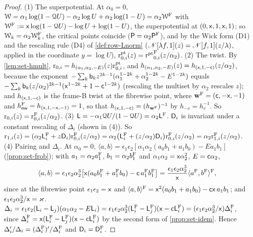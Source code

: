 \begin{proof}
(1) The superpotential. At $\alpha_0 = 0$, $\mathcal{W} = \alpha_1\log(1-\mathcal{Q} U) - \alpha_2\log U + \alpha_2\log(1-U) = \alpha_2\mathcal{W}^{\mathrm{F}}$ with $\mathcal{W}^{\mathrm{F}} := \mathsf{x}\log(1-\mathcal{Q} U) - \log U + \log(1-U)$, the superpotential at $(0,\mathsf{x},1,\mathsf{x},1)$; so $\mathcal{W}_k = \alpha_2\mathcal{W}_k^{\mathrm{F}}$, the critical points coincide ($\mathsf{P} = \alpha_2\mathsf{P}^{\mathrm{F}}$), and by the Wick form (D1) and the rescaling rule (D4) of \cref{def:row-Lnorm} ($\mathscr{N}[\lambda f,1](z) = \mathscr{N}[f,1](z/\lambda)$, applied in the coordinate $y = \log U$), $\mathrm{r}^{\mathrm{pt}}_{0,i}(z) = {\mathrm{r}^{\mathrm{pt}}}^{\mathrm{F}}_{0,i}(z/\alpha_2)$.
(2) The twist. By \cref{lem:set-hmult}, $\mathrm{r}_{0,i} = h_{(\alpha_1,\alpha_2,-E)}(z)\mathrm{r}^{\mathrm{pt}}_{0,i}$, and $h_{(\alpha_1,\alpha_2,-E)}(z) = h_{(\mathsf{x},1,-\mathsf{c})}(z/\alpha_2)$, because the exponent $-\sum_k\mathsf{b}_kz^{2k-1}(\alpha_1^{1-2k}+\alpha_2^{1-2k}-E^{1-2k})$ equals $-\sum_k\mathsf{b}_k(z/\alpha_2)^{2k-1}(\mathsf{x}^{1-2k}+1-\mathsf{c}^{1-2k})$ (rescaling the multiset by $\alpha_2$ rescales $z$); and $h_{(\mathsf{x},1,-\mathsf{c})}$ is the frame-B twist at the fibrewise point, where $\mathbf{w}^{\mathrm{F}} = (\mathsf{c},-\mathsf{x},-1)$ and $h_{\mathsf{nw}}^{\mathrm{F}} = h_{(\mathsf{x},1,-\mathsf{x},-1)} = 1$, so that $h_{(\mathsf{x},1,-\mathsf{c})} = (h_{\mathbf{w}^{\mathrm{F}}})^{-1}$ by $h_{-v} = h_v^{-1}$. So $\mathrm{r}_{0,i}(z) = \mathrm{r}^{\mathrm{F}}_{0,i}(z/\alpha_2)$.
(3) $\mathsf{L} = -\alpha_1\mathcal{Q} U/(1-\mathcal{Q} U) = \alpha_2\mathsf{L}^{\mathrm{F}}$. $\mathsf{D}_i$ is invariant under a constant rescaling of $\Delta_i$ (shown in (4)). So $\mathrm{r}_{1,i}(z) = (\alpha_2\mathsf{L}_i^{\mathrm{F}} + z\mathsf{D}_i)\mathrm{r}^{\mathrm{F}}_{0,i}(z/\alpha_2) = \alpha_2\bigl(\mathsf{L}_i^{\mathrm{F}} + (z/\alpha_2)\mathsf{D}_i\bigr)\mathrm{r}^{\mathrm{F}}_{0,i}(z/\alpha_2) = \alpha_2\mathrm{r}^{\mathrm{F}}_{1,i}(z/\alpha_2)$.
(4) Pairing and $\Delta_i$. At $\alpha_0 = 0$, $\langle a,b\rangle = \epsilon_1\epsilon_2[\alpha_1\alpha_2(a_0b_1+a_1b_0) - Ea_1b_1]$ (\cref{prop:set-frob}); with $a_1 = \alpha_2a_1^{\mathrm{F}}$, $b_1 = \alpha_2b_1^{\mathrm{F}}$ and $\alpha_1\alpha_2 = \mathsf{x}\alpha_2^2$, $E = \mathsf{c}\alpha_2$,
\[
\langle a,b\rangle = \epsilon_1\epsilon_2\alpha_2^3\bigl[\mathsf{x}(a_0b_1^{\mathrm{F}} + a_1^{\mathrm{F}}b_0) - \mathsf{c}\,a_1^{\mathrm{F}}b_1^{\mathrm{F}}\bigr] = \frac{\epsilon_1\epsilon_2\alpha_2^3}{\mathsf{x}}\langle a^{\mathrm{F}},b^{\mathrm{F}}\rangle^{\mathrm{F}},
\]
since at the fibrewise point $\epsilon_1\epsilon_2 = \mathsf{x}$ and $\langle a,b\rangle^{\mathrm{F}} = \mathsf{x}^2(a_0b_1+a_1b_0) - \mathsf{c}\mathsf{x}\,a_1b_1$; and $\epsilon_1\epsilon_2\alpha_2^3/\mathsf{x} = \varkappa$. $\Delta_i = \epsilon_1\epsilon_2(\mathsf{L}_i-\mathsf{L}_j)(\alpha_1\alpha_2 - E\mathsf{L}_i) = \epsilon_1\epsilon_2\alpha_2^3(\mathsf{L}_i^{\mathrm{F}}-\mathsf{L}_j^{\mathrm{F}})(\mathsf{x} - \mathsf{c}\mathsf{L}_i^{\mathrm{F}}) = (\epsilon_1\epsilon_2\alpha_2^3/\mathsf{x})\Delta_i^{\mathrm{F}}$, since $\Delta_i^{\mathrm{F}} = \mathsf{x}(\mathsf{L}_i^{\mathrm{F}}-\mathsf{L}_j^{\mathrm{F}})(\mathsf{x}-\mathsf{c}\mathsf{L}_i^{\mathrm{F}})$ by the second form of \cref{prop:set-idem}. Hence $\Delta_i'/\Delta_i = (\Delta_i^{\mathrm{F}})'/\Delta_i^{\mathrm{F}}$ and $\mathsf{D}_i = \mathsf{D}_i^{\mathrm{F}}$.

\end{proof}
